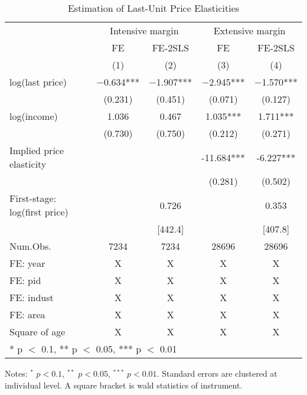 \documentclass[
  11pt,
  a4paper,
]{article}
\begin{document}
\begin{table}

\caption{\label{tab:MainElasticity}Estimation of Last-Unit Price Elasticities}
\centering
\fontsize{9}{11}\selectfont
\begin{threeparttable}
\begin{tabular}[t]{lcccc}
\toprule
\multicolumn{1}{c}{ } & \multicolumn{2}{c}{Intensive margin} & \multicolumn{2}{c}{Extensive margin} \\
\cmidrule(l{3pt}r{3pt}){2-3} \cmidrule(l{3pt}r{3pt}){4-5}
\multicolumn{1}{c}{ } & \multicolumn{1}{c}{FE} & \multicolumn{1}{c}{FE-2SLS} & \multicolumn{1}{c}{FE} & \multicolumn{1}{c}{FE-2SLS} \\
\cmidrule(l{3pt}r{3pt}){2-2} \cmidrule(l{3pt}r{3pt}){3-3} \cmidrule(l{3pt}r{3pt}){4-4} \cmidrule(l{3pt}r{3pt}){5-5}
  & (1) & (2) & (3) & (4)\\
\midrule
log(last price) & \num{-0.634}*** & \num{-1.907}*** & \num{-2.945}*** & \num{-1.570}***\\
 & (\num{0.231}) & (\num{0.451}) & (\num{0.071}) & (\num{0.127})\\
log(income) & \num{1.036} & \num{0.467} & \num{1.035}*** & \num{1.711}***\\
 & (\num{0.730}) & (\num{0.750}) & (\num{0.212}) & (\num{0.271})\\
\midrule
Implied price elasticity &  &  & -11.684*** & -6.227***\\
 &  &  & (0.281) & (0.502)\\
First-stage: log(first price) &  & 0.726 &  & 0.353\\
 &  & [442.4] &  & [407.8]\\
Num.Obs. & \num{7234} & \num{7234} & \num{28696} & \num{28696}\\
FE: year & X & X & X & X\\
FE: pid & X & X & X & X\\
FE: indust & X & X & X & X\\
FE: area & X & X & X & X\\
Square of age & X & X & X & X\\
\bottomrule
\multicolumn{5}{l}{\rule{0pt}{1em}* p $<$ 0.1, ** p $<$ 0.05, *** p $<$ 0.01}\\
\end{tabular}
\begin{tablenotes}
\item Notes: $^{*}$ $p < 0.1$, $^{**}$ $p < 0.05$, $^{***}$ $p < 0.01$. Standard errors are clustered at individual level. A square bracket is wald statistics of instrument.
\end{tablenotes}
\end{threeparttable}
\end{table}
\end{document}
